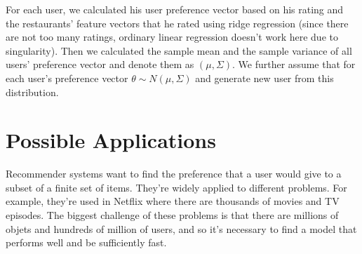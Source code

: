 \documentclass{article}
\theoremstyle{plain}
\theoremstyle{definition}
\begin{document}
For each user, we calculated his user preference vector based on his rating and the restaurants' feature vectors that he rated using ridge regression (since there are not too many ratings, ordinary linear regression doesn't work here due to singularity). Then we calculated the sample mean and the sample variance of all users' preference vector and denote them as $(\mu,\Sigma)$. We further assume that for each user's preference vector $\theta\sim N(\mu,\Sigma)$ and generate new user from this distribution.



\section{Possible Applications}

Recommender systems want to find the preference that a user would give to a subset of a finite set of items. They're widely applied to different problems. For example, they're used in Netflix where there are thousands of movies and TV episodes. The biggest challenge of these problems is that there are millions of objets and hundreds of million of users, and so it's necessary to find a model that performs well and be sufficiently fast.



\nocite{langley00}





%
%
%
\end{document}
